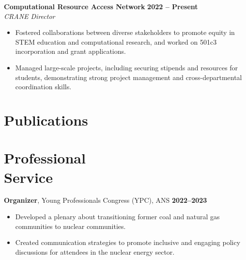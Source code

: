 \documentclass[margin,line]{resume}
\begin{document}
\begin{resume}
    \textbf{Computational Resource Access Network} \hfill \textbf{2022 -- Present} \\
    \textsl{CRANE Director} \\
    \begin{itemize}
        \item Fostered collaborations between diverse stakeholders to promote equity in STEM education and computational research, and worked on 501c3 incorporation and grant applications.
        \item Managed large-scale projects, including securing stipends and resources for students, demonstrating strong project management and cross-departmental coordination skills.
    \end{itemize}
    \section{\mysidestyle Publications}

    \begin{bibenum}
        \item {}
        \item {}
        \item {}
        \item {}
    \end{bibenum}

    \section{\mysidestyle Professional\\Service}

    \textbf{Organizer}, Young Professionals Congress (YPC), ANS \hfill \textbf{2022--2023}\vspace{.5mm}\\%
    \begin{itemize}
        \item Developed a plenary about transitioning former coal and natural gas communities to nuclear communities.
        \item Created communication strategies to promote inclusive and engaging policy discussions for attendees in the nuclear energy sector.
    \end{itemize}


\end{resume}
\end{document}
